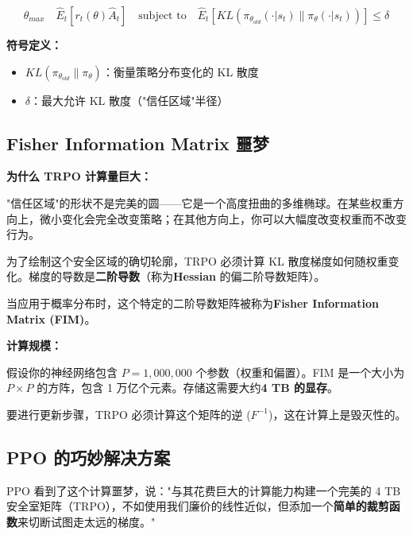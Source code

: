 \documentclass[12pt,a4paper]{article}
\theoremstyle{noteplain}
\theoremstyle{noteexercise}
\begin{document}
\begin{equation}\label{eq:trpo-constraint}
  \theta_{max} \quad \hat{E}_t\left[r_t(\theta) \hat{A}_t\right] \quad \text{subject to} \quad \hat{E}_t\left[KL(\pi_{\theta_{old}}(\cdot|s_t) \| \pi_\theta(\cdot|s_t))\right] \leq \delta
\end{equation}

\textbf{符号定义：}
\begin{itemize}
  \setlength{\itemsep}{0.2em}
  \item $KL(\pi_{\theta_{old}} \| \pi_\theta)$：衡量策略分布变化的 KL 散度
  \item $\delta$：最大允许 KL 散度（"信任区域"半径）
\end{itemize}

\subsection{Fisher Information Matrix 噩梦}

\textbf{为什么 TRPO 计算量巨大：}

"信任区域"的形状不是完美的圆——它是一个高度扭曲的多维椭球。在某些权重方向上，微小变化会完全改变策略；在其他方向上，你可以大幅度改变权重而不改变行为。

为了绘制这个安全区域的确切轮廓，TRPO 必须计算 KL 散度梯度如何随权重变化。梯度的导数是\textbf{二阶导数}（称为\textbf{Hessian} 的偏二阶导数矩阵）。

当应用于概率分布时，这个特定的二阶导数矩阵被称为\textbf{Fisher Information Matrix (FIM)}。

\textbf{计算规模：}

假设你的神经网络包含 $P = 1{,}000{,}000$ 个参数（权重和偏置）。FIM 是一个大小为 $P \times P$ 的方阵，包含 1 万亿个元素。存储这需要大约\textbf{4 TB 的显存}。

要进行更新步骤，TRPO 必须计算这个矩阵的逆 ($F^{-1}$)，这在计算上是毁灭性的。

\subsection{PPO 的巧妙解决方案}

PPO 看到了这个计算噩梦，说："与其花费巨大的计算能力构建一个完美的 4 TB 安全室矩阵（TRPO），不如使用我们廉价的线性近似，但添加一个\textbf{简单的裁剪函数}来切断试图走太远的梯度。"

\end{document}
